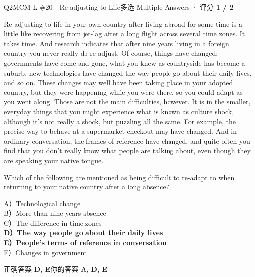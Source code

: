 \begin{qblock}{Q2\quad MCM-L \#20\ \ Re-adjusting to Life}{多选 Multiple Answers · 评分 \textcolor{cAccent}{\bfseries 1 / 2}}
\begin{promptbox}
Re-adjusting to life in your own country after living abroad for some time is a little like recovering from jet-lag after a long flight across several time zones. It takes time. And research indicates that after nine years living in a foreign country you never really do re-adjust. Of course, things have changed: governments have come and gone, what you knew as countryside has become a suburb, new technologies have changed the way people go about their daily lives, and so on. These changes may well have been taking place in your adopted country, but they were happening while you were there, so you could adapt as you went along. Those are not the main difficulties, however. It is in the smaller, everyday things that you might experience what is known as culture shock, although it's not really a shock, but puzzling all the same. For example, the precise way to behave at a supermarket checkout may have changed. And in ordinary conversation, the frames of reference have changed, and quite often you find that you don't really know what people are talking about, even though they are speaking your native tongue.
\end{promptbox}
\begin{notebox}\small Which of the following are mentioned as being difficult to re-adapt to when returning to your native country after a long absence?\end{notebox}
{\small
A）Technological change\\
B）More than nine years absence\\
C）The difference in time zones\\
{\color{cFix}\textbf{D）The way people go about their daily lives}}\\
{\color{cFix}\textbf{E）People's terms of reference in conversation}}\\
F）Changes in government}
\smallskip\par
{\small 正确答案 \textcolor{cFix}{\bfseries D, E}\qquad 你的答案 {\color{cWrong}\bfseries A,} {\color{cFix}\bfseries D, E}}
\end{qblock}

